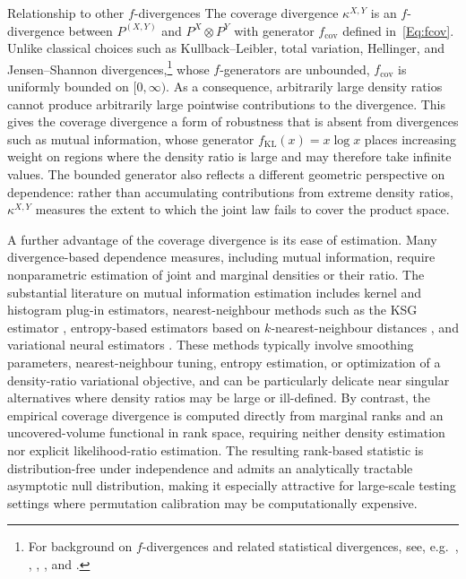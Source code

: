 \documentclass[11pt]{article}
\begin{document}
\begin{paragraph}{Relationship to other $f$-divergences}
The coverage divergence $\kappa^{X,Y}$ is an $f$-divergence between
$P^{(X,Y)}$ and $P^X \otimes P^Y$ with generator $f_{\mathrm{cov}}$ defined in~\eqref{Eq:fcov}. Unlike classical choices such as Kullback--Leibler, total variation,
Hellinger, and Jensen--Shannon divergences,\footnote{For background on $f$-divergences and
related statistical divergences, see, e.g.~\citet{Morimoto1963}, \citet{AliSilvey1966},
\citet{Csiszar1967}, \citet{Sason2022}, and \citet{PolyanskiyWu2025}.} whose $f$-generators
are unbounded, $f_{\mathrm{cov}}$ is uniformly bounded on $[0,\infty)$.
As a consequence, arbitrarily large density ratios cannot produce
arbitrarily large pointwise contributions to the divergence. This gives
the coverage divergence a form of robustness that is absent from
divergences such as mutual information, whose generator
$f_{\mathrm{KL}}(x)=x\log x$ places increasing weight on regions where
the density ratio is large and may therefore take infinite values. The
bounded generator also reflects a different geometric perspective on
dependence: rather than accumulating contributions from extreme
density ratios, $\kappa^{X,Y}$ measures the extent to which the joint
law fails to cover the product space. 

A further advantage of the coverage divergence is its ease of estimation.
Many divergence-based dependence measures, including mutual information,
require nonparametric estimation of joint and marginal densities or their
ratio. The substantial literature on mutual information estimation includes
kernel and histogram plug-in estimators, nearest-neighbour methods such as
the KSG estimator \citep{kraskov2004estimating}, entropy-based estimators based on
$k$-nearest-neighbour distances \citep{KozachenkoLeonenko1987,BerrettSY2019},
and variational neural estimators \citep{BelghaziEtAl2018}. These methods
typically involve smoothing parameters, nearest-neighbour tuning, entropy
estimation, or optimization of a density-ratio variational objective, and
can be particularly delicate near singular alternatives where density
ratios may be large or ill-defined. By contrast, the empirical coverage
divergence is computed directly from marginal ranks and an uncovered-volume
functional in rank space, requiring neither density estimation nor explicit
likelihood-ratio estimation. The resulting rank-based statistic is
distribution-free under independence and admits an analytically tractable
asymptotic null distribution, making it especially attractive for
large-scale testing settings where permutation calibration may be
computationally expensive.
\end{paragraph}
\end{document}
